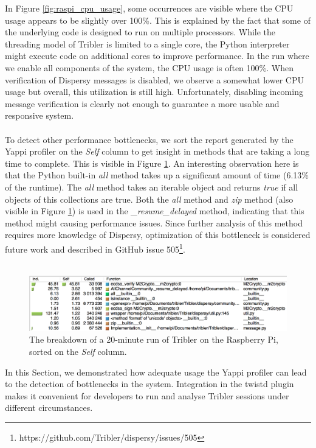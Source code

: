 In Figure \ref{fig:raspi_cpu_usage}, some occurrences are visible where the CPU usage appears to be slightly over 100\%. This is explained by the fact that some of the underlying code is designed to run on multiple processors. While the threading model of Tribler is limited to a single core, the Python interpreter might execute code on additional cores to improve performance. In the run where we enable all components of the system, the CPU usage is often 100\%. When verification of Dispersy messages is disabled, we observe a somewhat lower CPU usage but overall, this utilization is still high. Unfortunately, disabling incoming message verification is clearly not enough to guarantee a more usable and responsive system.\\\\
To detect other performance bottlenecks, we sort the report generated by the Yappi profiler on the \emph{Self} column to get insight in methods that are taking a long time to complete. This is visible in Figure \ref{fig:yappi_breakdown_self}. An interesting observation here is that the Python built-in \emph{all} method takes up a significant amount of time (6.13\% of the runtime). The \emph{all} method takes an iterable object and returns \emph{true} if all objects of this collections are true. Both the \emph{all} method and \emph{zip} method (also visible in Figure \ref{fig:yappi_breakdown_self}) is used in the \emph{\_resume\_delayed} method, indicating that this method might causing performance issues. Since further analysis of this method requires more knowledge of Dispersy, optimization of this bottleneck is considered future work and described in GitHub issue 505\footnote{https://github.com/Tribler/dispersy/issues/505}.\\\\

\begin{figure}[!h]
	\centering
	\includegraphics[width=0.9\columnwidth]{images/experiments/yappi_breakdown_self}
	\caption{The breakdown of a 20-minute run of Tribler on the Raspberry Pi, sorted on the \emph{Self} column.}
	\label{fig:yappi_breakdown_self}
\end{figure}

In this Section, we demonstrated how adequate usage the Yappi profiler can lead to the detection of bottlenecks in the system. Integration in the twistd plugin makes it convenient for developers to run and analyse Tribler sessions under different circumstances.

